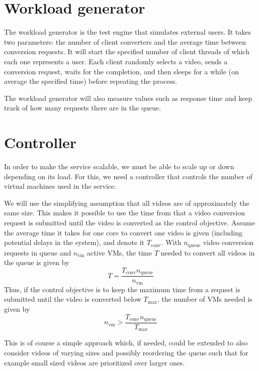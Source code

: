 \documentclass[a4paper, 10pt, english]{article}
\begin{document}
\section{Workload generator} \label{sec:WG}
The workload generator is the test engine that simulates external users. It takes two parameters: the number of client converters and the average time between conversion requests. It will start the specified number of client threads of which each one represents a user. Each client randomly selects a video, sends a conversion request, waits for the completion, and then sleeps for a while (on average the specified time) before repeating the process.

The workload generator will also measure values such as response time and keep track of how many requests there are in the queue.
\section{Controller} \label{sec:Controller}
In order to make the service scalable, we must be able to scale up or down depending on its load. For this, we need a controller that controls the number of virtual machines used in the service.

We will use the simplifying assumption that all videos are of approximately the same size. This makes it possible to use the time from that a video conversion request is submitted until the video is converted as the control objective. Assume the average time it takes for one core to convert one video is given (including potential delays in the system), and denote it $ T_{\text{conv}} $. With $ n_{\text{queue}} $ video conversion requests in queue and $ n_{\text{vm}} $ active VMs, the time $ T $ needed to convert all videos in the queue is given by
\begin{equation}
T = \frac{T_{\text{conv}}  n_{\text{queue}}}{n_{\text{vm}}}
\end{equation}
Thus, if the control objective is to keep the maximum time from a request is submitted until the video is converted below $ T_{\text{max}} $, the number of VMs needed is given by
\begin{equation}
n_{\text{vm}} > \frac{T_{\text{conv}}  n_{\text{queue}}}{T_{\text{max}}}
\end{equation}

This is of course a simple approach which, if needed, could be extended to also consider videos of varying sizes and possibly reordering the queue such that for example small sized videos are prioritized over larger ones.
\end{document}
